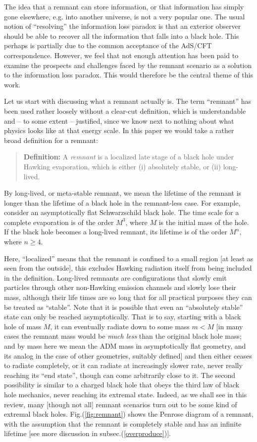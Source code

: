 \documentclass[12pt]{article}
\newcommand{\2}{$^2$}
\newcommand{\3}{$^3$}
\newcommand{\4}{$_4$}
\newcommand{\5}{$_5$}
\begin{document}
The idea that a remnant can store information, or that information has simply gone elsewhere, e.g. into another universe, is not a very popular one. The usual notion of ``resolving'' the information loss paradox is that an exterior observer should be able to recover all the information that falls into a black hole. This perhaps is partially due to the common acceptance of the AdS/CFT correspondence. However, we feel that not enough attention has been paid to examine the prospects and challenges faced by the remnant scenario as a solution to the information loss paradox. This would therefore be the central theme of this work.

Let us start with discussing what a remnant actually is.
The term ``remnant'' has been used rather loosely without a clear-cut definition, which is understandable and -- to some extent -- justified, since we know next to nothing about what physics looks like at that energy scale. In this paper we would take a rather broad definition for a remnant: 
\begin{quote}
\textbf{Definition:} A \emph{remnant} is a localized late stage of a black hole under Hawking evaporation, which is either (i) absolutely stable, or (ii) long-lived.
\end{quote}
By long-lived, or meta-stable remnant, we mean the lifetime of the remnant is longer than the lifetime of a black hole in the remnant-less case. For example, consider an asymptotically flat Schwarzschild black hole. 
The time scale for a complete evaporation is of the order $M^3$, where $M$ is the initial mass of the hole. If the black hole becomes a long-lived remnant, its lifetime is of the order $M^n$, where $n \geqslant 4$.

Here, ``localized'' means that the remnant is confined to a small region [at least as seen from the outside], this excludes Hawking radiation itself from being included in the definition.
Long-lived remnants are configurations that slowly emit particles through other non-Hawking emission channels and slowly lose their mass, although their life times are so long that for all practical purposes they can be treated as ``stable''.
Note that it is possible that even an ``absolutely stable'' state can only be reached asymptotically. 
That is to say, starting with a black hole of mass $M$, it can eventually radiate down to some mass $m < M$ [in many cases the remnant mass would be \emph{much less} than the original black hole mass; and by mass here we mean the ADM mass in asymptotically flat geometry, and its analog in the case of other geometries, suitably defined] and then either ceases to radiate completely, or it can radiate at increasingly slower rate, never really reaching its ``end state'', though can come arbitrarily close to it. The second possibility is similar to a charged black hole that obeys the third law of black hole mechanics, never reaching its extremal state. Indeed, as we shall see in this review, many [though not all] remnant scenarios turn out to be some kind of extremal black holes. Fig.(\ref{fig:remnant}) shows the Penrose diagram of a remnant, with the assumption that the remnant is completely stable and has an infinite lifetime [see more discussion in subsec.(\ref{overproduce})].
\end{document}
